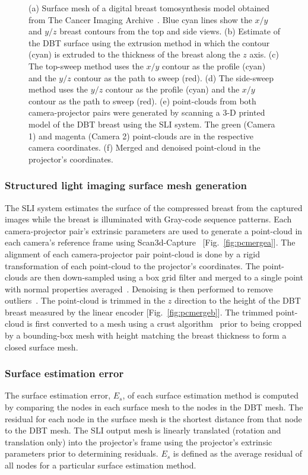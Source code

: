 \begin{figure}
\begin{center}
	\end{center}
	\caption{(a) Surface mesh of a digital breast tomosynthesis model obtained from The Cancer Imaging Archive~\cite{Clark2013}. Blue cyan lines show the $x/y$ and $y/z$ breast contours from the top and side views. (b) Estimate of the \ac{DBT} surface using the extrusion method in which the contour (cyan) is extruded to the thickness of the breast along the $z$ axis. (c) The top-sweep method uses the $x/y$ contour as the profile (cyan) and the $y/z$ contour as the path to sweep (red). (d) The side-sweep method uses the $y/z$ contour as the profile (cyan) and the $x/y$ contour as the path to sweep (red). (e) point-clouds from both camera-projector pairs were generated by scanning a 3-D printed model of the \ac{DBT} breast using the \ac{SLI} system. The green (Camera 1) and magenta (Camera 2) point-clouds are in the respective camera coordinates. (f) Merged and denoised point-cloud in the projector's coordinates.} 
	\label{fig:meshes}
\end{figure} 

\subsubsection{Structured light imaging surface mesh generation}
The \ac{SLI} system estimates the surface of the compressed breast from the captured images while the breast is illuminated with Gray-code sequence patterns. Each camera-projector pair's extrinsic parameters are used to generate a point-cloud in each camera's reference frame using Scan3d-Capture~\cite{Moreno2012a} [Fig.~\ref{fig:pcmergea}]. The alignment of each camera-projector pair point-cloud is done by a rigid transformation of each point-cloud to the projector's coordinates. The point-clouds are then down-sampled using a box grid filter and merged to a single point with normal properties averaged~\cite{Pomerleau2013}. Denoising is then performed to remove outliers~\cite{Rusu2008}. The point-cloud is trimmed in the $z$ direction to the height of the \ac{DBT} breast measured by the linear encoder [Fig.~\ref{fig:pcmergeb}]. The trimmed point-cloud is first converted to a mesh using a crust algorithm~\cite{Crust1999} prior to being cropped by a bounding-box mesh with height matching the breast thickness to form a closed surface mesh. 

\subsubsection{Surface estimation error}
The surface estimation error, $E_s$, of each surface estimation method is computed by comparing the nodes in each surface mesh to the nodes in the \ac{DBT} mesh. The residual for each node in the surface mesh is the shortest distance from that node to the \ac{DBT} mesh. The \ac{SLI} output mesh is linearly translated (rotation and translation only) into the projector's frame using the projector's extrinsic parameters prior to determining residuals. $E_s$ is defined as the average residual of all nodes for a particular surface estimation method. 

